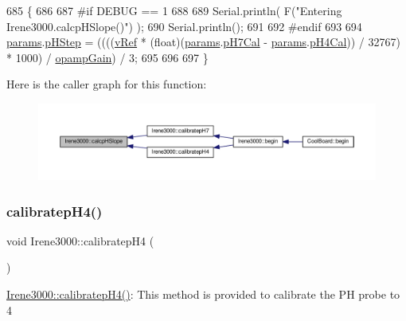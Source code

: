 \begin{DoxyCode}
685 \{
686 
687 \textcolor{preprocessor}{#if DEBUG == 1 }
688 
689     Serial.println( F(\textcolor{stringliteral}{"Entering Irene3000.calcpHSlope()"}) );
690     Serial.println();
691 
692 \textcolor{preprocessor}{#endif }
693 
694     \hyperlink{class_irene3000_a136585a5ee7f9ac6ab52175fa153f8e3}{params}.\hyperlink{struct_irene3000_1_1parameters___t_a61cfcc2539d5f630e9071f3753aba9fe}{pHStep} = ((((\hyperlink{class_irene3000_a018e7ff9bee57e6d2b298667a668ba7e}{vRef} * (float)(\hyperlink{class_irene3000_a136585a5ee7f9ac6ab52175fa153f8e3}{params}.\hyperlink{struct_irene3000_1_1parameters___t_a21265466a570d84bff914f26d2f7a03e}{pH7Cal} - 
      \hyperlink{class_irene3000_a136585a5ee7f9ac6ab52175fa153f8e3}{params}.\hyperlink{struct_irene3000_1_1parameters___t_a1144de6fb54eb3e1dd2a3d8c2afc97dc}{pH4Cal})) / 32767) * 1000) / \hyperlink{class_irene3000_a4e588985ca74e5076029d5dee81034f2}{opampGain}) / 3;
695 
696  
697 \}
\end{DoxyCode}
Here is the caller graph for this function\+:\nopagebreak
\begin{figure}[H]
\begin{center}
\leavevmode
\includegraphics[width=350pt]{d6/d03/class_irene3000_a81f6a79e546679692053f7ac1af49613_icgraph}
\end{center}
\end{figure}
\mbox{\label{class_irene3000_aa140dd026922a04981edfd04d46cabbe}} 
\subsubsection{\texorpdfstring{calibratep\+H4()}{calibratepH4()}}
{\footnotesize\ttfamily void Irene3000\+::calibratep\+H4 (\begin{DoxyParamCaption}{ }\end{DoxyParamCaption})}

\hyperlink{class_irene3000_aa140dd026922a04981edfd04d46cabbe}{Irene3000\+::calibratep\+H4()}\+: This method is provided to calibrate the PH probe to 4 

